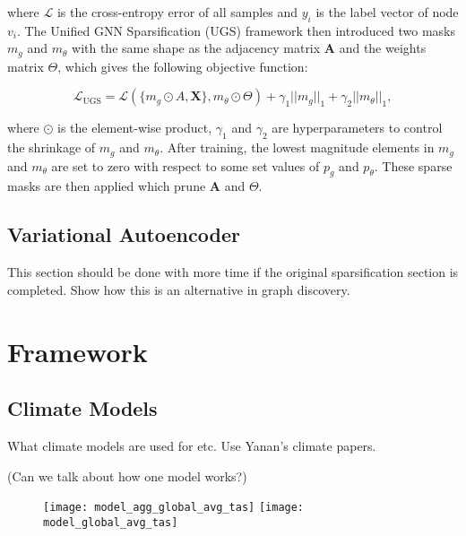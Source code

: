 \documentclass[honours,12pt]{unswthesis}
\numberwithin{equation}{section}
\begin{document}
where $\mathcal{L}$ is the cross-entropy error of all samples and $y_i$ is the label vector of node $v_i$. The Unified GNN Sparsification (UGS)
framework then introduced two masks $m_g$ and $m_\theta$ with the same shape as the adjacency matrix $\textbf{A}$ and the weights matrix $\Theta$, which
gives the following objective function:

\begin{equation}
    \mathcal{L}_{\text{UGS}} = \mathcal{L}(\{m_g \odot A, \textbf{X}\}, m_\theta \odot \Theta) + \gamma_1 ||m_g||_1 + \gamma_2 ||m_\theta||_1,
\end{equation}

\noindent where $\odot$ is the element-wise product, $\gamma_1$ and $\gamma_2$ are hyperparameters to control the shrinkage of $m_g$ and $m_\theta$.
After training, the lowest magnitude elements in $m_g$ and $m_\theta$ are set to zero with respect to some set values of $p_g$ and $p_\theta$.
These sparse masks are then applied which prune $\textbf{A}$ and $\Theta$.

\section{Variational Autoencoder}\label{vgae}
This section should be done with more time if the original sparsification section is completed.
Show how this is an alternative in graph discovery.




\chapter{Framework}\label{framework}



\section{Climate Models}\label{climate}
What climate models are used for etc.
Use Yanan's climate papers.


(Can we talk about how one model works?)

\begin{figure}[!h]
    \texttt{[image: model\_agg\_global\_avg\_tas]}
    \texttt{[image: model\_global\_avg\_tas]}
    \centering
\end{figure}
\end{document}
